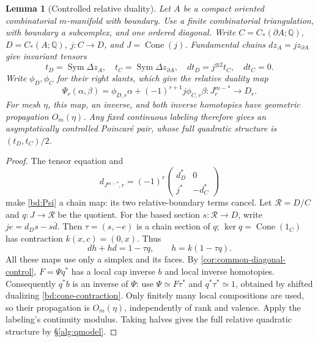 \documentclass[11pt]{amsart}
\numberwithin{equation}{section}
\newtheorem{lemma}[lemma]{Lemma}
\theoremstyle{definition}
\theoremstyle{remark}
\newcommand{\Q}{\mathbb Q}
\begin{document}
\begin{lemma}[Controlled relative duality]\label{bd:relative}
Let $A$ be a compact oriented combinatorial $m$-manifold with boundary.
Use a finite combinatorial triangulation, with boundary a subcomplex,
and one ordered
diagonal. Write $C=C_*(\partial A;\Q)$, $D=C_*(A;\Q)$,
$j:C\to D$, and $J=\operatorname{Cone}(j)$. Fundamental chains
$dz_A=jz_{\partial A}$ give invariant tensors
\[
 t_D=\operatorname{Sym}\Delta z_A,\quad
 t_C=\operatorname{Sym}\Delta z_{\partial A},\quad
 dt_D=j^{\otimes2}t_C,\quad dt_C=0.
\]
Write $\phi_D,\phi_C$ for their right slants, which give the relative duality map
\begin{equation}\label{bd:Psi}
 \Psi_r(\alpha,\beta)=\phi_{D,r}\alpha
       +(-1)^{r+1}j\phi_{C,r}\beta:
       J^{m-*}_r\longrightarrow D_r.
\end{equation}
For mesh $\eta$, this map, an inverse, and both inverse homotopies
have geometric propagation $O_m(\eta)$. Any fixed continuous labeling
therefore gives an asymptotically controlled Poincar\'e pair, whose
full quadratic structure is $(t_D,t_C)/2$.
\end{lemma}
\begin{proof}
The tensor equation and
\[
 d_{J^{m-*},r}=(-1)^r
 \begin{pmatrix}d_D^*&0\\j^*&-d_C^*\end{pmatrix}
\]
make \eqref{bd:Psi} a chain map: its two relative-boundary terms cancel.
Let $\mathcal R=D/C$ and $q:J\to\mathcal R$ be the quotient.
For the based section $s:\mathcal R\to D$, write
$je=d_Ds-s\bar d$. Then $\tau=(s,-e)$ is a chain section of $q$;
$\ker q=\operatorname{Cone}(1_C)$ has contraction $k(x,c)=(0,x)$.
Thus
\begin{equation}\label{bd:cone-contraction}
 dh+hd=1-\tau q,\qquad h=k(1-\tau q).
\end{equation}
All these maps use only a simplex and its faces. By
\cref{cor:common-diagonal-control}, $F=\Psi q^*$ has a local cap inverse
$b$ and local inverse homotopies. Consequently $q^*b$ is an inverse
of $\Psi$: use $\Psi\simeq F\tau^*$ and
$q^*\tau^*\simeq1$, obtained by shifted dualizing
\eqref{bd:cone-contraction}. Only finitely many local compositions are
used, so their propagation is $O_m(\eta)$, independently of rank and
valence. Apply the labeling's continuity modulus. Taking halves gives
the full relative quadratic structure by \S\ref{alg:qmodel}.
\end{proof}
\end{document}
